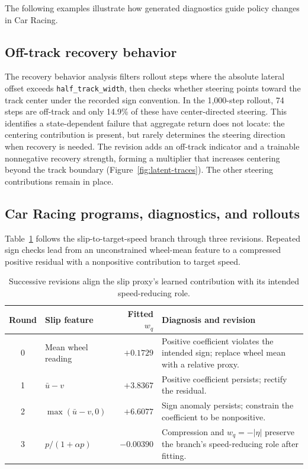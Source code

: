The following examples illustrate how generated diagnostics guide policy changes in Car Racing.

\subsection{Off-track recovery behavior}
\label{app:recovery-record}

The recovery behavior analysis filters rollout steps where the absolute lateral offset exceeds \texttt{half\_track\_width}, then checks whether steering points toward the track center under the recorded sign convention.
In the 1,000-step rollout, 74 steps are off-track and only 14.9\% of these have center-directed steering.
This identifies a state-dependent failure that aggregate return does not locate: the centering contribution is present, but rarely determines the steering direction when recovery is needed.
The revision adds an off-track indicator and a trainable nonnegative recovery strength, forming a multiplier that increases centering beyond the track boundary (Figure~\ref{fig:latent-traces}).
The other steering contributions remain in place.

\subsection{Car Racing programs, diagnostics, and rollouts}
\label{app:car-record}

Table~\ref{tab:matched-record} follows the slip-to-target-speed branch through three revisions.
Repeated sign checks lead from an unconstrained wheel-mean feature to a compressed positive residual with a nonpositive contribution to target speed.

\begin{table}[!t]
\centering\small
\begin{tabular}{@{}clrp{.40\linewidth}@{}}
\toprule
Round & Slip feature & Fitted $w_q$ & Diagnosis and revision \\
\midrule
0 & Mean wheel reading & $+0.1729$ & Positive coefficient violates the intended sign; replace wheel mean with a relative proxy. \\
1 & $\bar u-v$ & $+3.8367$ & Positive coefficient persists; rectify the residual. \\
2 & $\max(\bar u-v,0)$ & $+6.6077$ & Sign anomaly persists; constrain the coefficient to be nonpositive. \\
3 & $p/(1+\alpha p)$ & $-0.00390$ & Compression and $w_q=-|\eta|$ preserve the branch's speed-reducing role after fitting. \\
\bottomrule
\end{tabular}
\caption{Successive revisions align the slip proxy's learned contribution with its intended speed-reducing role.}
\label{tab:matched-record}
\end{table}

